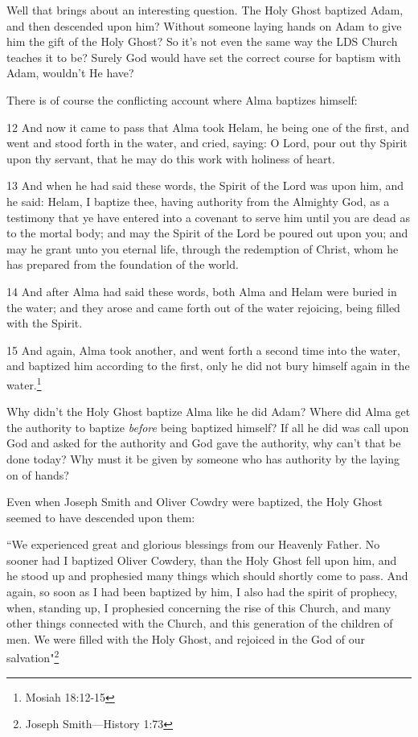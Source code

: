 Well that brings about an interesting question. The Holy Ghost baptized Adam, and
then descended upon him? Without someone laying hands on Adam to give him the gift of
the Holy Ghost? So it's not even the same way the LDS Church teaches it to be? Surely
God would have set the correct course for baptism with Adam, wouldn't He have?

There is of course the conflicting account where Alma baptizes himself:

\begin{displayquote}
12 And now it came to pass that Alma took Helam, he being one of the first, and went 
and stood forth in the water, and cried, saying: O Lord, pour out thy Spirit upon thy 
servant, that he may do this work with holiness of heart.

13 And when he had said these words, the Spirit of the Lord was upon him, and he 
said: Helam, I baptize thee, having authority from the Almighty God, as a testimony 
that ye have entered into a covenant to serve him until you are dead as to the mortal 
body; and may the Spirit of the Lord be poured out upon you; and may he grant unto 
you eternal life, through the redemption of Christ, whom he has prepared from the 
foundation of the world.

14 And after Alma had said these words, both Alma and Helam were buried in the 
water; and they arose and came forth out of the water rejoicing, being filled with 
the Spirit.

15 And again, Alma took another, and went forth a second time into the water, and 
baptized him according to the first, only he did not bury himself again in the 
water.\footnote{Mosiah 18:12-15}
\end{displayquote}

Why didn't the Holy Ghost baptize Alma like he did Adam? Where did Alma get the
authority to baptize \textit{before} being baptized himself? If all he did was call
upon God and asked for the authority and God gave the authority, why can't that be
done today? Why must it be given by someone who has authority by the laying on of
hands?

Even when Joseph Smith and Oliver Cowdry were baptized, the Holy Ghost seemed to have
descended upon them:

\begin{displayquote}
``We experienced great and glorious blessings from our Heavenly Father. No sooner had 
I baptized Oliver Cowdery, than the Holy Ghost fell upon him, and he stood up and 
prophesied many things which should shortly come to pass. And again, so soon as 
I had been baptized by him, I also had the spirit of prophecy, when, standing up, 
I prophesied concerning the rise of this Church, and many other things connected 
with the Church, and this generation of the children of men. We were filled with 
the Holy Ghost, and rejoiced in the God of our salvation"\footnote{
Joseph Smith—History 1:73}
\end{displayquote}

